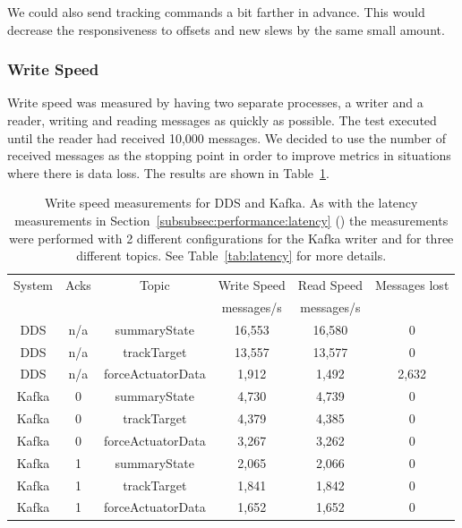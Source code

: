 \documentclass[]{spie}  %
\begin{document}
We could also send tracking commands a bit farther in advance.
This would decrease the responsiveness to offsets and new slews by the same small amount.

\subsubsection{Write Speed}
\label{subsubsec:performance:speed}

Write speed was measured by having two separate processes, a writer and a reader, writing and reading messages as quickly as possible.
The test executed until the reader had received 10,000 messages.
We decided to use the number of received messages as the stopping point in order to improve metrics in situations where there is data loss.
The results are shown in Table~\ref{tab:speed}.

\begin{table}[h]
    \centering
    \begin{tabular}{|c|c|c|c|c|c|}
        \hline
        System & Acks & Topic             & Write Speed & Read Speed & Messages lost \\
               &      &                   & messages/s  & messages/s &               \\
        \hline
        DDS    & n/a  & summaryState      & 16,553      & 16,580     & 0             \\
        DDS    & n/a  & trackTarget       & 13,557      & 13,577     & 0             \\
        DDS    & n/a  & forceActuatorData &  1,912      &  1,492     & 2,632         \\
        Kafka  & 0    & summaryState      &  4,730      &  4,739     & 0             \\
        Kafka  & 0    & trackTarget       &  4,379      &  4,385     & 0             \\
        Kafka  & 0    & forceActuatorData &  3,267      &  3,262     & 0             \\
        Kafka  & 1    & summaryState      &  2,065      &  2,066     & 0             \\
        Kafka  & 1    & trackTarget       &  1,841      &  1,842     & 0             \\
        Kafka  & 1    & forceActuatorData &  1,652      &  1,652     & 0             \\
        \hline
    \end{tabular}
    \caption{
      Write speed measurements for DDS and Kafka.
      As with the latency measurements in Section~\ref{subsubsec:performance:latency} () the measurements were performed with 2 different configurations for the Kafka writer and for three different topics.
      See Table~\ref{tab:latency} for more details.
    }
    \label{tab:speed}
\end{table}
\end{document}
